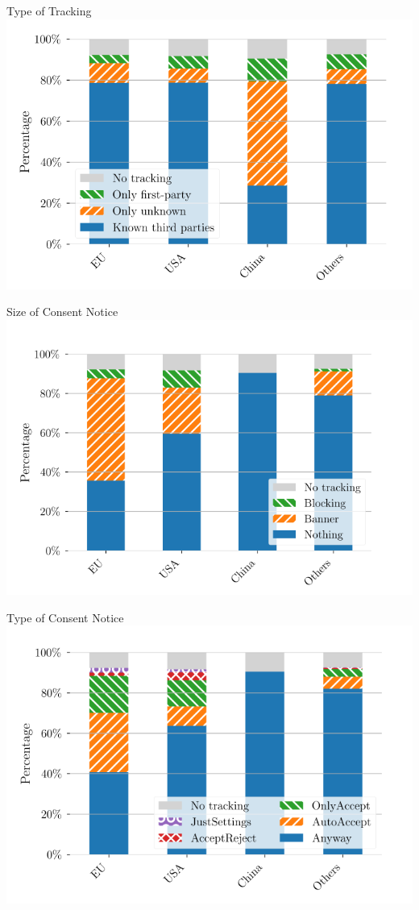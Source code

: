 \documentclass[xcolor={dvipsnames}]{beamer}
\begin{document}
\begin{frame}{Type of Tracking}
    \centering
    \includegraphics[scale=0.36]{figures/tracking_kind_trans.png}
\end{frame}

\begin{frame}{Size of Consent Notice}
    \centering
    \includegraphics[scale=0.4]{figures/cookie_notice_size_trans.png}
\end{frame}

\begin{frame}{Type of Consent Notice}
    \centering
    \includegraphics[scale=0.4]{figures/cookie_notice_type_trans.png}
\end{frame}
\end{document}
